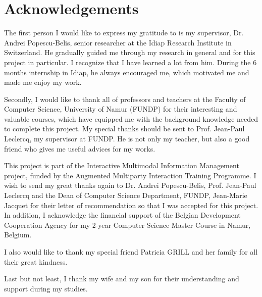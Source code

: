 


\chapter*{Acknowledgements}      %
\small

The first person I would like to express my gratitude to is my supervisor, Dr. Andrei Popescu-Belis, senior researcher at the Idiap Research Institute in Switzerland. He gradually guided me through my research in general and for this project in particular. I recognize that I have learned a lot from him. During the 6 months internship in Idiap, he always encouraged me, which motivated me and made me enjoy my work. 

Secondly, I would like to thank all of professors and teachers at the Faculty of Computer Science, University of Namur (FUNDP) for their interesting and valuable courses, which have equipped me with the background knowledge needed to complete this project. My special thanks should be sent to Prof. Jean-Paul Leclercq, my supervisor at FUNDP. He is not only my teacher, but also a good friend who gives me useful advices for my works. 

This project is part of the Interactive Multimodal Information Management project, funded by the Augmented Multiparty Interaction Training Programme. I wish to send my great thanks again to Dr. Andrei Popescu-Belis, Prof. Jean-Paul Leclercq and the Dean of Computer Science Department, FUNDP, Jean-Marie Jacquet for their letter of recommendation so that I was accepted for this project. In addition, I acknowledge the financial support of the Belgian Development Cooperation Agency for my 2-year Computer Science Master Course in Namur, Belgium.

I also would like to thank my special friend Patricia GRILL and her family for all their great kindness.

Last but not least, I thank my wife and my son for their understanding and support during my studies. %

\normalsize



